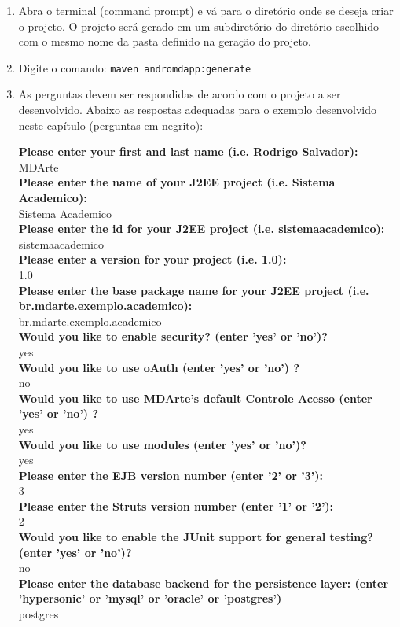 \begin{enumerate}
\item Abra o terminal (command prompt) e vá para o diretório onde se deseja
criar o projeto. O projeto será gerado em um subdiretório do
diretório escolhido com o mesmo nome da pasta definido na geração do projeto.

\item Digite o comando: \texttt{maven andromdapp:generate}

\item As perguntas devem ser respondidas de acordo com o projeto a ser
desenvolvido. Abaixo as respostas adequadas para o exemplo desenvolvido neste
capítulo (perguntas em negrito):

\textbf{Please enter your first and last name (i.e. Rodrigo Salvador):} \\
MDArte\\
\textbf{Please enter the name of your J2EE project (i.e. Sistema Academico):}\\
Sistema Academico\\
\textbf{Please enter the id for your J2EE project (i.e. sistemaacademico):}\\
sistemaacademico\\
\textbf{Please enter a version for your project (i.e. 1.0):}\\
1.0\\
\textbf{Please enter the base package name for your J2EE project (i.e. br.mdarte.exemplo.academico):}\\
br.mdarte.exemplo.academico\\
\textbf{Would you like to enable security? (enter 'yes' or 'no')?}\\
yes\\
\textbf{Would you like to use oAuth (enter 'yes' or 'no') ?}\\
no\\
\textbf{Would you like to use MDArte's default Controle Acesso (enter 'yes' or
'no') ?}\\
yes\\
\textbf{Would you like to use modules (enter 'yes' or 'no')?}\\
yes\\
\textbf{Please enter the EJB version number (enter '2' or '3'):}\\
3\\
\textbf{Please enter the Struts version number (enter '1' or '2'):}\\
2\\
\textbf{Would you like to enable the JUnit support for general testing? (enter
'yes' or 'no')? }\\
 no\\
\textbf{Please enter the database backend for the persistence layer: (enter
'hypersonic' or 'mysql' or 'oracle' or 'postgres')}\\
 postgres\\
 

\end{enumerate}
